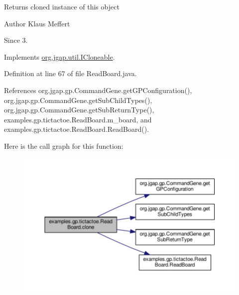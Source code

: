 \begin{DoxyReturn}{Returns}
cloned instance of this object
\end{DoxyReturn}
\begin{DoxyAuthor}{Author}
Klaus Meffert 
\end{DoxyAuthor}
\begin{DoxySince}{Since}
3. 
\end{DoxySince}


Implements \hyperlink{interfaceorg_1_1jgap_1_1util_1_1_i_cloneable_aa7e7d62077e6428ad7904932b1b4f7d5}{org.\-jgap.\-util.\-I\-Cloneable}.



Definition at line 67 of file Read\-Board.\-java.



References org.\-jgap.\-gp.\-Command\-Gene.\-get\-G\-P\-Configuration(), org.\-jgap.\-gp.\-Command\-Gene.\-get\-Sub\-Child\-Types(), org.\-jgap.\-gp.\-Command\-Gene.\-get\-Sub\-Return\-Type(), examples.\-gp.\-tictactoe.\-Read\-Board.\-m\-\_\-board, and examples.\-gp.\-tictactoe.\-Read\-Board.\-Read\-Board().



Here is the call graph for this function\-:
\nopagebreak
\begin{figure}[H]
\begin{center}
\leavevmode
\includegraphics[width=350pt]{classexamples_1_1gp_1_1tictactoe_1_1_read_board_a16dc3287840e937283729b9b89616a20_cgraph}
\end{center}
\end{figure}


